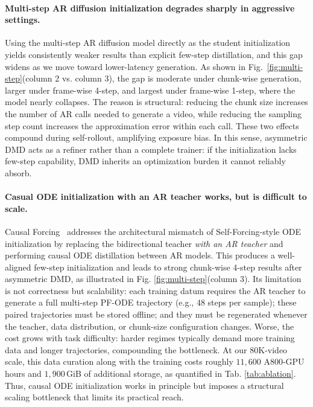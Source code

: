 \documentclass{llmxive}
\begin{document}
\paragraph{Multi-step AR diffusion initialization degrades sharply in aggressive settings.} Using the multi-step AR diffusion model directly as the student initialization yields consistently weaker results than explicit few-step distillation, and this gap widens as we move toward lower-latency generation. As shown in Fig.~\ref{fig:multi-step}(column 2 vs. column 3), the gap is moderate under chunk-wise generation, larger under frame-wise 4-step, and largest under frame-wise 1-step, where the model nearly collapses. The reason is structural: reducing the chunk size increases the number of AR calls needed to generate a video, while reducing the sampling step count increases the approximation error within each call. These two effects compound during self-rollout, amplifying exposure bias. In this sense, asymmetric DMD acts as a refiner rather than a complete trainer: if the initialization lacks few-step capability, DMD inherits an optimization burden it cannot reliably absorb.


\paragraph{Casual ODE initialization with an AR teacher works, but is difficult to scale.}
Causal Forcing~\cite{zhu2026causal} addresses the architectural mismatch of Self-Forcing-style ODE initialization by replacing the bidirectional teacher \emph{with an AR teacher} and performing causal ODE distillation between AR models. This produces a well-aligned few-step initialization and leads to strong chunk-wise 4-step results after asymmetric DMD, as illustrated in Fig. \ref{fig:multi-step}(column 3). Its limitation is not correctness but scalability: each training datum requires the AR teacher to generate a full multi-step PF-ODE trajectory (e.g., 48 steps per sample); these paired trajectories must be stored offline; and they must be regenerated whenever the teacher, data distribution, or chunk-size configuration changes. Worse, the cost grows with task difficulty: harder regimes typically demand more training data and longer trajectories, compounding the bottleneck.
At our 80K-video scale, this data curation along with the training costs roughly $11{,}600$ A800-GPU hours and $1{,}900$\,GiB of additional storage, as quantified in Tab. \ref{tab:ablation}. Thus, causal ODE initialization works in principle but imposes a structural scaling bottleneck that limits its practical reach.
\end{document}

